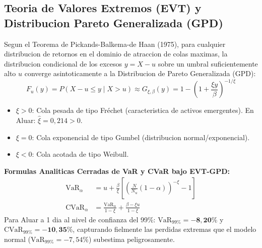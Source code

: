 \documentclass[10pt,a4paper]{article}
\theoremstyle{definition}
\begin{document}
\subsection{Teoria de Valores Extremos (EVT) y Distribucion Pareto Generalizada (GPD)}
Segun el Teorema de Pickands-Balkema-de Haan (1975), para cualquier distribucion de retornos en el dominio de atraccion de colas maximas, la distribucion condicional de los excesos $y = X - u$ sobre un umbral suficientemente alto $u$ converge asintoticamente a la Distribucion de Pareto Generalizada (GPD):
\begin{equation}
F_u(y) = P(X - u \le y \mid X > u) \approx G_{\xi, \beta}(y) = 1 - \left( 1 + \frac{\xi y}{\beta} \right)^{-1/\xi}
\end{equation}
\begin{itemize}
    \item $\xi > 0$: Cola pesada de tipo Fréchet (caracteristica de activos emergentes). En Aluar: $\hat{\xi} = 0,214 > 0$.
    \item $\xi = 0$: Cola exponencial de tipo Gumbel (distribucion normal/exponencial).
    \item $\xi < 0$: Cola acotada de tipo Weibull.
\end{itemize}
\textbf{Formulas Analiticas Cerradas de VaR y CVaR bajo EVT-GPD:}
\begin{align}
\text{VaR}_\alpha & = u + \frac{\beta}{\xi} \left[ \left( \frac{N}{N_u} (1 - \alpha) \right)^{-\xi} - 1 \right] \\
\text{CVaR}_\alpha & = \frac{\text{VaR}_\alpha}{1 - \xi} + \frac{\beta - \xi u}{1 - \xi}
\end{align}
Para Aluar a 1 dia al nivel de confianza del 99\%: $\text{VaR}_{99\%} = \mathbf{-8,20\%}$ y $\text{CVaR}_{99\%} = \mathbf{-10,35\%}$, capturando fielmente las perdidas extremas que el modelo normal ($\text{VaR}_{99\%} = -7,54\%$) subestima peligrosamente.
\end{document}
